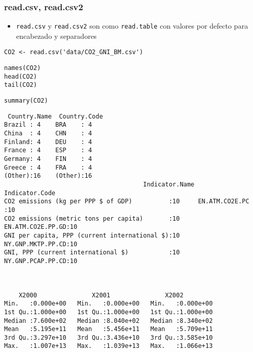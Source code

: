 \documentclass[xcolor={usenames,svgnames,dvipsnames}]{beamer}
\begin{document}
\begin{frame}[fragile]
\frametitle{read.csv, read.csv2}
\label{sec-2-3}

\begin{itemize}
\item \texttt{read.csv} y \texttt{read.csv2} son como \texttt{read.table} con valores
  por defecto para encabezado y separadores
\end{itemize}


\lstset{language=R}
\begin{lstlisting}
CO2 <- read.csv('data/CO2_GNI_BM.csv')
\end{lstlisting}



\lstset{language=R}
\begin{lstlisting}
names(CO2)
head(CO2)
tail(CO2)
\end{lstlisting}

\lstset{language=R}
\begin{lstlisting}
summary(CO2)
\end{lstlisting}


\begin{verbatim}
 Country.Name  Country.Code
Brazil : 4    BRA    : 4   
China  : 4    CHN    : 4   
Finland: 4    DEU    : 4   
France : 4    ESP    : 4   
Germany: 4    FIN    : 4   
Greece : 4    FRA    : 4   
(Other):16    (Other):16   
                                      Indicator.Name           Indicator.Code
CO2 emissions (kg per PPP $ of GDP)          :10     EN.ATM.CO2E.PC   :10    
CO2 emissions (metric tons per capita)       :10     EN.ATM.CO2E.PP.GD:10    
GNI per capita, PPP (current international $):10     NY.GNP.MKTP.PP.CD:10    
GNI, PPP (current international $)           :10     NY.GNP.PCAP.PP.CD:10    
                                                                             
                                                                             
                                                                             
    X2000               X2001               X2002          
Min.   :0.000e+00   Min.   :0.000e+00   Min.   :0.000e+00  
1st Qu.:1.000e+00   1st Qu.:1.000e+00   1st Qu.:1.000e+00  
Median :7.600e+02   Median :8.040e+02   Median :8.340e+02  
Mean   :5.195e+11   Mean   :5.456e+11   Mean   :5.709e+11  
3rd Qu.:3.297e+10   3rd Qu.:3.436e+10   3rd Qu.:3.585e+10  
Max.   :1.007e+13   Max.   :1.039e+13   Max.   :1.066e+13  
                                                           

\end{verbatim}
\end{frame}
\end{document}
